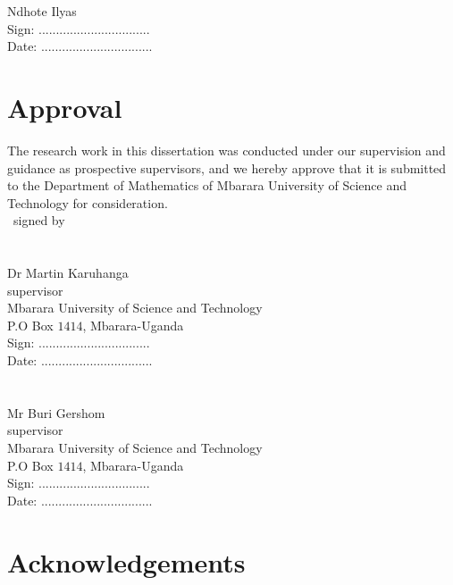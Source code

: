 \documentclass[12pt,oneside,a4paper]{book}
\theoremstyle{definition}
\theoremstyle{remark}
\begin{document}
		\vspace{0.25in}

		Ndhote Ilyas\\
		Sign: ................................\\
		Date: ................................
	\newpage
	\section*{Approval}
		The research work in this dissertation was conducted under our supervision and guidance as prospective supervisors, and we hereby approve that it is submitted to the Department of Mathematics of Mbarara University of Science and Technology for consideration.\\\
		signed by\\\\
		\vspace{0.25in}\\

		Dr Martin Karuhanga\\
		supervisor\\
		Mbarara  University of Science and Technology\\
		P.O Box $1414$,	Mbarara-Uganda\\
		Sign: ................................\\
		Date: ................................\\\\
		\vspace{0.25in}\\

		Mr Buri Gershom\\
		supervisor\\
		Mbarara University of Science and Technology\\
		P.O Box $1414$,	Mbarara-Uganda\\
		Sign: ................................\\
		Date: ................................
		\vspace{0.25in}


	\newpage
	\section*{Acknowledgements}
\end{document}
